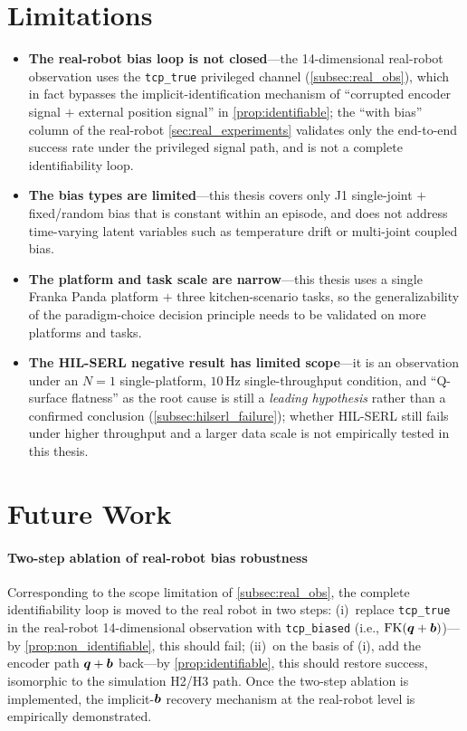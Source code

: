 \section{Limitations}\label{sec:limitations}

\begin{itemize}
  \item \textbf{The real-robot bias loop is not closed}---the 14-dimensional real-robot observation uses the \texttt{tcp\_true} privileged channel (\cref{subsec:real_obs}), which in fact bypasses the implicit-identification mechanism of ``corrupted encoder signal $+$ external position signal'' in \cref{prop:identifiable}; the ``with bias'' column of the real-robot \cref{sec:real_experiments} validates only the end-to-end success rate under the privileged signal path, and is not a complete identifiability loop.
  \item \textbf{The bias types are limited}---this thesis covers only J1 single-joint $+$ fixed/random bias that is constant within an episode, and does not address time-varying latent variables such as temperature drift or multi-joint coupled bias.
  \item \textbf{The platform and task scale are narrow}---this thesis uses a single Franka Panda platform $+$ three kitchen-scenario tasks, so the generalizability of the paradigm-choice decision principle needs to be validated on more platforms and tasks.
  \item \textbf{The HIL-SERL negative result has limited scope}---it is an observation under an $N=1$ single-platform, $10$\,Hz single-throughput condition, and ``Q-surface flatness'' as the root cause is still a \emph{leading hypothesis} rather than a confirmed conclusion (\cref{subsec:hilserl_failure}); whether HIL-SERL still fails under higher throughput and a larger data scale is not empirically tested in this thesis.
\end{itemize}

\section{Future Work}\label{sec:future_work}

\paragraph{Two-step ablation of real-robot bias robustness} Corresponding to the scope limitation of \cref{subsec:real_obs}, the complete identifiability loop is moved to the real robot in two steps: (i)~replace \texttt{tcp\_true} in the real-robot 14-dimensional observation with \texttt{tcp\_biased} (i.e., $\text{FK}(\bm{q}+\bm{b})$)---by \cref{prop:non_identifiable}, this should fail; (ii)~on the basis of (i), add the encoder path $\bm{q}+\bm{b}$ back---by \cref{prop:identifiable}, this should restore success, isomorphic to the simulation H2/H3 path. Once the two-step ablation is implemented, the implicit-$\bm{b}$ recovery mechanism at the real-robot level is empirically demonstrated.


